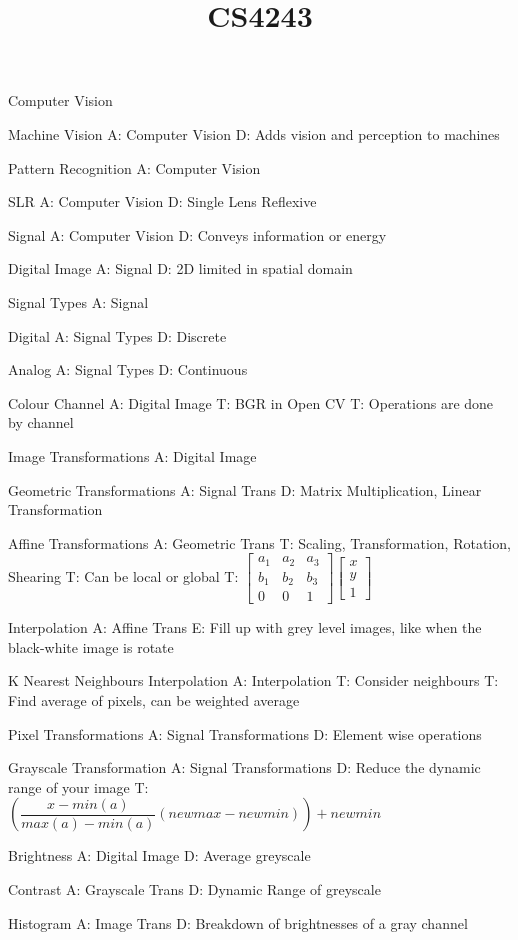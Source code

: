 \documentclass{article}
\title{CS4243}
\begin{document}
Computer Vision

Machine Vision
A: Computer Vision
D: Adds vision and perception to machines

Pattern Recognition
A: Computer Vision

SLR
A: Computer Vision
D: Single Lens Reflexive

Signal
A: Computer Vision
D: Conveys information or energy

Digital Image
A: Signal
D: 2D limited in spatial domain

Signal Types
A: Signal

Digital
A: Signal Types
D: Discrete

Analog
A: Signal Types
D: Continuous

Colour Channel
A: Digital Image
T: BGR in Open CV
T: Operations are done by channel

Image Transformations
A: Digital Image

Geometric Transformations
A: Signal Trans
D: Matrix Multiplication, Linear Transformation

Affine Transformations
A: Geometric Trans
T: Scaling, Transformation, Rotation, Shearing
T: Can be local or global
T: $\begin{bmatrix} a_1 & a_2 & a_3 \\ b_1 & b_2 & b_3 \\ 0 & 0 & 1 \end{bmatrix} \begin{bmatrix} x \\ y \\ 1 \end{bmatrix}$

Interpolation
A: Affine Trans
E: Fill up with grey level images, like when the black-white image is rotate

K Nearest Neighbours Interpolation
A: Interpolation
T: Consider neighbours
T: Find average of pixels, can be weighted average

Pixel Transformations
A: Signal Transformations
D: Element wise operations

Grayscale Transformation
A: Signal Transformations
D: Reduce the dynamic range of your image
T: $(\dfrac{x-min(a)}{max(a)-min(a)}(newmax-newmin))+newmin$

Brightness
A: Digital Image
D: Average greyscale

Contrast
A: Grayscale Trans
D: Dynamic Range of greyscale

Histogram
A: Image Trans
D: Breakdown of brightnesses of a gray channel
\end{document}

